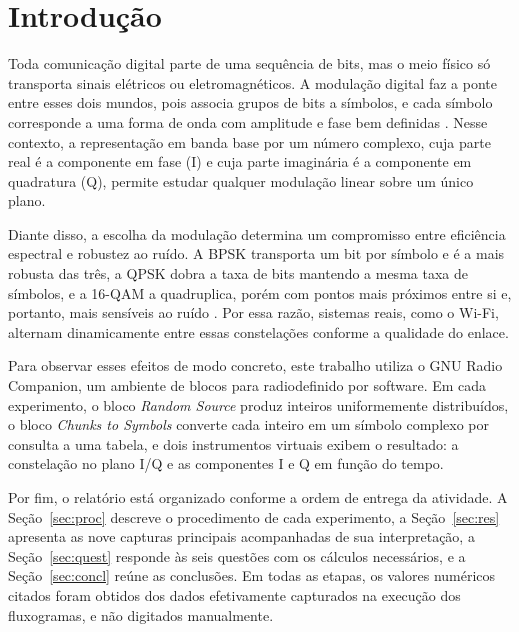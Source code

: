 \documentclass[12pt,a4paper]{article}
\begin{document}
\clearpage
\tableofcontents
\clearpage

\section{Introdução}

Toda comunicação digital parte de uma sequência de bits, mas o meio físico só transporta sinais elétricos ou eletromagnéticos. A modulação digital faz a ponte entre esses dois mundos, pois associa grupos de bits a símbolos, e cada símbolo corresponde a uma forma de onda com amplitude e fase bem definidas \cite{proakis2008,haykin2008}. Nesse contexto, a representação em banda base por um número complexo, cuja parte real é a componente em fase (I) e cuja parte imaginária é a componente em quadratura (Q), permite estudar qualquer modulação linear sobre um único plano.

Diante disso, a escolha da modulação determina um compromisso entre eficiência espectral e robustez ao ruído. A BPSK transporta um bit por símbolo e é a mais robusta das três, a QPSK dobra a taxa de bits mantendo a mesma taxa de símbolos, e a 16-QAM a quadruplica, porém com pontos mais próximos entre si e, portanto, mais sensíveis ao ruído \cite{sklar2001}. Por essa razão, sistemas reais, como o Wi-Fi, alternam dinamicamente entre essas constelações conforme a qualidade do enlace.

Para observar esses efeitos de modo concreto, este trabalho utiliza o GNU Radio Companion, um ambiente de blocos para radiodefinido por software. Em cada experimento, o bloco \textit{Random Source} produz inteiros uniformemente distribuídos, o bloco \textit{Chunks to Symbols} converte cada inteiro em um símbolo complexo por consulta a uma tabela, e dois instrumentos virtuais exibem o resultado: a constelação no plano I/Q e as componentes I e Q em função do tempo.

Por fim, o relatório está organizado conforme a ordem de entrega da atividade. A Seção~\ref{sec:proc} descreve o procedimento de cada experimento, a Seção~\ref{sec:res} apresenta as nove capturas principais acompanhadas de sua interpretação, a Seção~\ref{sec:quest} responde às seis questões com os cálculos necessários, e a Seção~\ref{sec:concl} reúne as conclusões. Em todas as etapas, os valores numéricos citados foram obtidos dos dados efetivamente capturados na execução dos fluxogramas, e não digitados manualmente.
\end{document}
